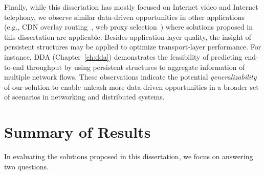 %
Finally, while this dissertation has mostly focused on 
Internet video and Internet telephony, 
we observe similar data-driven opportunities in other applications
(e.g., CDN overlay routing~\cite{mukerjee2015practical}, 
web proxy selection~\cite{footprint})
where solutions proposed in this dissertation are applicable.
Besides application-layer quality, the insight of persistent structures may be applied 
to optimize transport-layer performance.
For instance, DDA (Chapter~\ref{ch:dda}) demonstrates the feasibility of predicting end-to-end 
throughput by using persistent structures to aggregate information of multiple network flows.
These observations indicate the potential {\em generalizability} of our solution to enable
unleash more data-driven opportunities in a broader set of scenarios in 
networking and distributed systems.







\section{Summary of Results}
In evaluating the solutions proposed in this dissertation, 
we focus on answering two questions.

